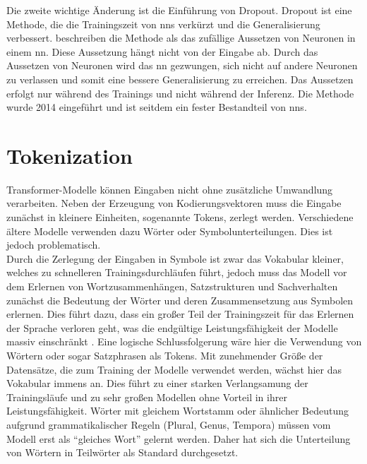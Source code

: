 Die zweite wichtige Änderung ist die Einführung von Dropout.
Dropout ist eine Methode, die die Trainingszeit von \ac{nn}s verkürzt und die Generalisierung verbessert.
\citet{dropout} beschreiben die Methode als das zufällige Aussetzen von Neuronen in einem \ac{nn}. 
Diese Aussetzung hängt nicht von der Eingabe ab.
Durch das Aussetzen von Neuronen wird das \ac{nn} gezwungen, sich nicht auf andere Neuronen zu verlassen und somit eine bessere Generalisierung zu erreichen.
Das Aussetzen erfolgt nur während des Trainings und nicht während der Inferenz.
Die Methode wurde 2014 eingeführt und ist seitdem ein fester Bestandteil von \ac{nn}s.\\

\section{Tokenization}\label{sec:tokenization}
Transformer-Modelle können Eingaben nicht ohne zusätzliche Umwandlung verarbeiten.
Neben der Erzeugung von Kodierungsvektoren muss die Eingabe zunächst in kleinere Einheiten, sogenannte Tokens, zerlegt werden.
Verschiedene ältere Modelle verwenden dazu Wörter oder Symbolunterteilungen.
Dies ist jedoch problematisch.\\

Durch die Zerlegung der Eingaben in Symbole ist zwar das Vokabular kleiner, welches zu schnelleren Trainingsdurchläufen führt, jedoch muss das Modell vor dem Erlernen von Wortzusammenhängen, Satzstrukturen und Sachverhalten zunächst die Bedeutung der Wörter und deren Zusammensetzung aus Symbolen erlernen.
Dies führt dazu, dass ein großer Teil der Trainingszeit für das Erlernen der Sprache verloren geht, was die endgültige Leistungsfähigkeit der Modelle massiv einschränkt \citep{bpe}.
Eine logische Schlussfolgerung wäre hier die Verwendung von Wörtern oder sogar Satzphrasen als Tokens.
Mit zunehmender Größe der Datensätze, die zum Training der Modelle verwendet werden, wächst hier das Vokabular immens an.
Dies führt zu einer starken Verlangsamung der Trainingsläufe und zu sehr großen Modellen ohne Vorteil in ihrer Leistungsfähigkeit.
Wörter mit gleichem Wortstamm oder ähnlicher Bedeutung aufgrund grammatikalischer Regeln (Plural, Genus, Tempora) müssen vom Modell erst als \enquote{gleiches Wort} gelernt werden.
Daher hat sich die Unterteilung von Wörtern in Teilwörter als Standard durchgesetzt.

